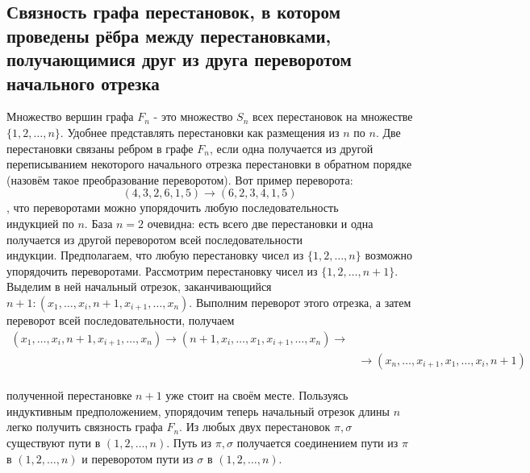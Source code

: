\documentclass[a4paper]{article}
\begin{document}
\subsection{Связность графа перестановок, в котором проведены рёбра между перестановками, получающимися друг из друга переворотом начального отрезка}
Множество вершин графа $F_{n}$ - это множество $S_{n}$ всех перестановок на множестве $\{1,2, \ldots, n\}$. Удобнее представлять перестановки как размещения из $n$ по $n$. Две перестановки связаны ребром в графе $F_{n}$, если одна получается из другой переписыванием некоторого начального отрезка перестановки в обратном порядке (назовём такое преобразование переворотом). Вот пример переворота:
$$
(4,3,2,6,1,5) \rightarrow(6,2,3,4,1,5)
$$
, что переворотами можно упорядочить любую последовательность\\[2mm]
 индукцией по $n$. База $n=2$ очевидна: есть всего две перестановки и одна получается из другой переворотом всей последовательности\\[2mm]
 индукции. Предполагаем, что любую перестановку чисел из $\{1,2, \ldots, n\}$ возможно упорядочить переворотами. Рассмотрим перестановку чисел из $\{1,2, \ldots, n+1\}$. Выделим в ней начальный отрезок, заканчивающийся $n+1:\left(x_{1}, \ldots, x_{i}, n+1, x_{i+1}, \ldots, x_{n}\right)$. Выполним переворот этого отрезка, а затем переворот всей последовательности, получаем
$$
\begin{aligned}
\left(x_{1}, \ldots, x_{i}, n+1, x_{i+1}, \ldots, x_{n}\right) \rightarrow\left(n+1, x_{i}, \ldots, x_{1}, x_{i+1}, \ldots, x_{n}\right) \rightarrow & \\
& \rightarrow\left(x_{n}, \ldots, x_{i+1}, x_{1}, \ldots, x_{i}, n+1\right)
\end{aligned}
$$\\[2mm]
 полученной перестановке $n+1$ уже стоит на своём месте. Пользуясь индуктивным предположением, упорядочим теперь начальный отрезок длины $n$\\[2mm]
 легко получить связность графа $F_{n}$. Из любых двух перестановок $\pi, \sigma$ существуют пути в $(1,2, \ldots, n)$. Путь из $\pi, \sigma$ получается соединением пути из $\pi$ в $(1,2, \ldots, n)$ и переворотом пути из $\sigma$ в $(1,2, \ldots, n)$.
\end{document}
